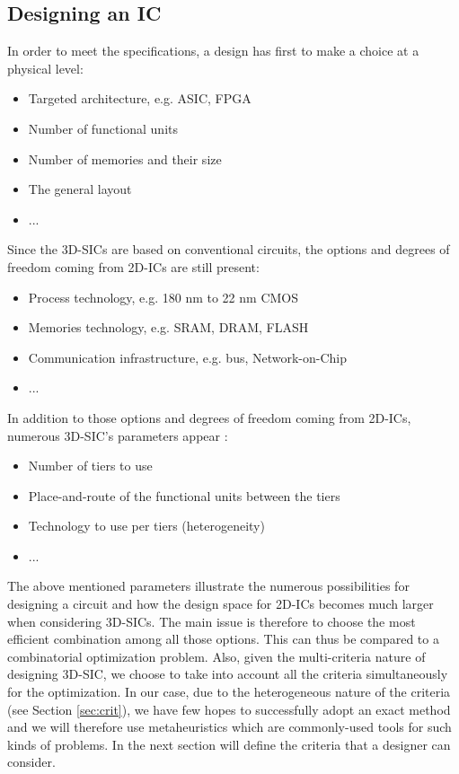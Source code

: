\subsection{Designing an IC}
In order to meet the specifications, a design has first to make a choice at a physical level:
\begin{itemize}
\item Targeted architecture, e.g. ASIC, FPGA
\item Number of functional units
\item Number of memories and their size
\item The general layout
\item ...
\end{itemize}
Since the 3D-SICs are based on conventional circuits, the options and degrees of freedom coming from 2D-ICs are still present:
\begin{itemize}
\item Process technology, e.g. 180 nm to 22 nm CMOS
\item Memories technology, e.g. SRAM, DRAM, FLASH
\item Communication infrastructure, e.g. bus, Network-on-Chip
\item ...
\end{itemize}
In addition to those options and degrees of freedom coming from 2D-ICs, numerous 3D-SIC's parameters appear \cite{659500}:
\begin{itemize}
\item Number of tiers to use
\item Place-and-route of the functional units between the tiers
\item Technology to use per tiers (heterogeneity)
\item ...
\end{itemize}

The above mentioned parameters illustrate the numerous possibilities for designing a circuit and how the design space for 2D-ICs becomes much larger when considering 3D-SICs. The main issue is therefore to choose the most efficient combination among all those options. This can thus be compared to a combinatorial optimization problem. Also, given the multi-criteria nature of designing 3D-SIC, we choose to take into account all the criteria simultaneously for the optimization. In our case, due to the heterogeneous nature of the criteria (see Section \ref{sec:crit}), we have few hopes to successfully adopt an exact method and we will therefore use metaheuristics which are commonly-used tools for such kinds of problems. In the next section will define the criteria that a designer can consider.

